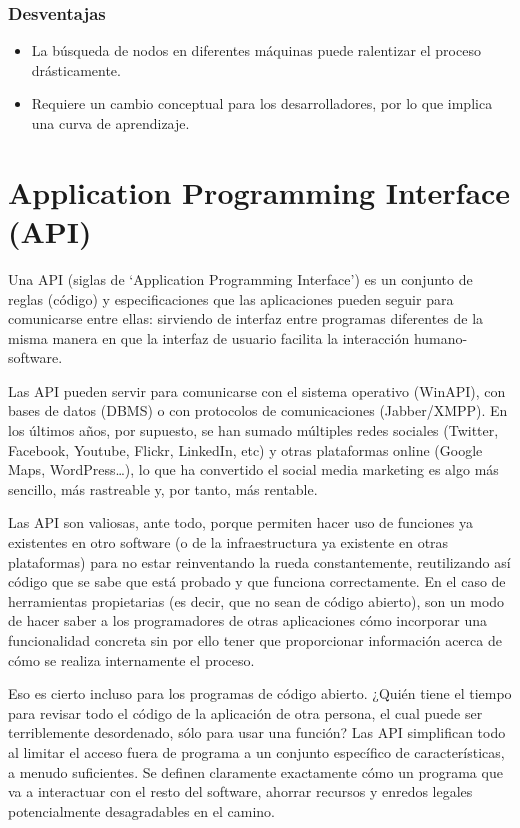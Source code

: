 		\subsubsection{Desventajas}
		\begin{itemize}
		 \item La búsqueda de nodos en diferentes máquinas puede ralentizar el proceso drásticamente.
		 \item Requiere un cambio conceptual para los desarrolladores, por lo que implica una curva de aprendizaje.
		\end{itemize}\cite{9}


 \section{Application Programming Interface (API)}
 	Una API (siglas de ‘Application Programming Interface’) es un conjunto de reglas (código) y especificaciones que las aplicaciones pueden seguir para comunicarse entre ellas: sirviendo de interfaz entre programas diferentes de la misma manera en que la interfaz de usuario facilita la interacción humano-software.

	Las API pueden servir para comunicarse con el sistema operativo (WinAPI), con bases de datos (DBMS) o con protocolos de comunicaciones (Jabber/XMPP). En los últimos años, por supuesto, se han sumado múltiples redes sociales (Twitter, Facebook, Youtube, Flickr, LinkedIn, etc) y otras plataformas online (Google Maps, WordPress…), lo que ha convertido el social media marketing es algo más sencillo, más rastreable y, por tanto, más rentable.

	Las API son valiosas, ante todo, porque permiten hacer uso de funciones ya existentes en otro software (o de la infraestructura ya existente en otras plataformas) para no estar reinventando la rueda constantemente, reutilizando así código que se sabe que está probado y que funciona correctamente. En el caso de herramientas propietarias (es decir, que no sean de código abierto), son un modo de hacer saber a los programadores de otras aplicaciones cómo incorporar una funcionalidad concreta sin por ello tener que proporcionar información acerca de cómo se realiza internamente el proceso. \cite{3}

	Eso es cierto incluso para los programas de código abierto. ¿Quién tiene el tiempo para revisar todo el código de la aplicación de otra persona, el cual puede ser terriblemente desordenado, sólo para usar una función? Las API simplifican todo al limitar el acceso fuera de programa a un conjunto específico de características, a menudo suficientes. Se definen claramente exactamente cómo un programa que va a interactuar con el resto del software, ahorrar recursos y enredos legales potencialmente desagradables en el camino. \cite{10}
